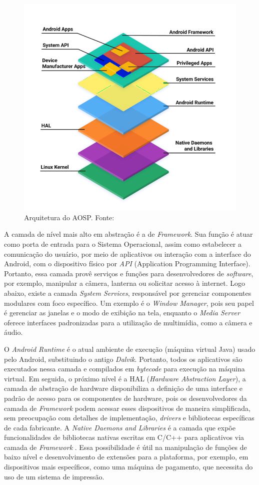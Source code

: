\begin{figure}[ht]
    \centering
    \includegraphics[width=.55\textwidth]{img/android_stack_720.png}
    \caption{Arquitetura do AOSP. Fonte:\cite{aosp-documentation}}\label{figArchAOSP}
\end{figure}

A camada de nível mais alto em abstração é a de \textit{Framework}. Sua função é atuar como porta de entrada para o Sistema Operacional, assim como
estabelecer a comunicação do usuário, por meio de aplicativos ou interação com a interface do Android, com o dispositivo físico por \textit{API} (Application Programming Interface).
Portanto, essa camada provê serviços e funções para desenvolvedores de \textit{software}, por exemplo, manipular a câmera, lanterna ou solicitar acesso à internet. Logo abaixo, existe 
a camada \textit{System Services}, responsável por gerenciar componentes modulares com foco específico. Um exemplo é o \textit{Window Manager}, pois seu papel é gerenciar as janelas e o modo de exibição na tela, 
enquanto o \textit{Media Server} oferece interfaces padronizadas para a utilização de multimídia, como a câmera e áudio.

O \textit{Android Runtime} é o atual ambiente de execução (máquina virtual Java) usado pelo Android, substituindo o antigo \textit{Dalvik}. 
Portanto, todos os aplicativos são executados nessa camada e compilados em \textit{bytecode} para execução na máquina virtual. Em seguida,
o próximo nível é a HAL (\textit{Hardware Abstraction Layer}), a camada de abstração de hardware disponibiliza a definição 
de uma interface e padrão de acesso para os componentes de hardware, pois os desenvolvedores da camada de \textit{Framework} podem acessar 
esses dispositivos de maneira simplificada, sem preocupação com detalhes de implementação, \textit{drivers} e bibliotecas específicas de cada fabricante. A 
\textit{Native Daemons and Libraries} é a camada que expõe funcionalidades de bibliotecas nativas escritas em C/C++ para aplicativos via camada de \textit{Framework} \cite{google-developers-architecture}. 
Essa possibilidade é útil na manipulação de funções de baixo nível e desenvolvimento de extensões para a plataforma, por exemplo, em dispositivos mais específicos, como uma 
máquina de pagamento, que necessita do uso de um sistema de impressão.

